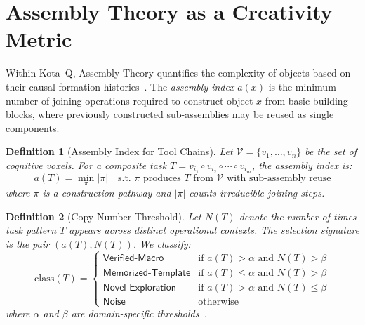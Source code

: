 \documentclass[11pt,a4paper]{article}
\newtheorem{definition}{Definition}
\begin{document}
\section{Assembly Theory as a Creativity Metric}
\label{sec:assembly}

Within Kota~Q, Assembly Theory quantifies the complexity of objects based on their causal formation histories~\citep{sharma2023assembly}. The \emph{assembly index} $a(x)$ is the minimum number of joining operations required to construct object $x$ from basic building blocks, where previously constructed sub-assemblies may be reused as single components.

\begin{definition}[Assembly Index for Tool Chains]
Let $\mathcal{V} = \{v_1, \ldots, v_n\}$ be the set of cognitive voxels. For a composite task $T = v_{i_1} \circ v_{i_2} \circ \cdots \circ v_{i_m}$, the assembly index is:
\begin{equation}
    a(T) = \min_{\pi} |\pi| \quad \text{s.t. } \pi \text{ produces } T \text{ from } \mathcal{V} \text{ with sub-assembly reuse}
    \label{eq:assembly_index}
\end{equation}
where $\pi$ is a construction pathway and $|\pi|$ counts irreducible joining steps.
\end{definition}

\begin{definition}[Copy Number Threshold]
Let $N(T)$ denote the number of times task pattern $T$ appears across distinct operational contexts. The \emph{selection signature} is the pair $(a(T), N(T))$. We classify:
\begin{equation}
    \text{class}(T) = \begin{cases}
        \textsf{Verified-Macro} & \text{if } a(T) > \alpha \text{ and } N(T) > \beta \\
        \textsf{Memorized-Template} & \text{if } a(T) \leq \alpha \text{ and } N(T) > \beta \\
        \textsf{Novel-Exploration} & \text{if } a(T) > \alpha \text{ and } N(T) \leq \beta \\
        \textsf{Noise} & \text{otherwise}
    \end{cases}
    \label{eq:copy_threshold}
\end{equation}
where $\alpha$ and $\beta$ are domain-specific thresholds~\citep{seet2025assemblytheory}.
\end{definition}
\end{document}
